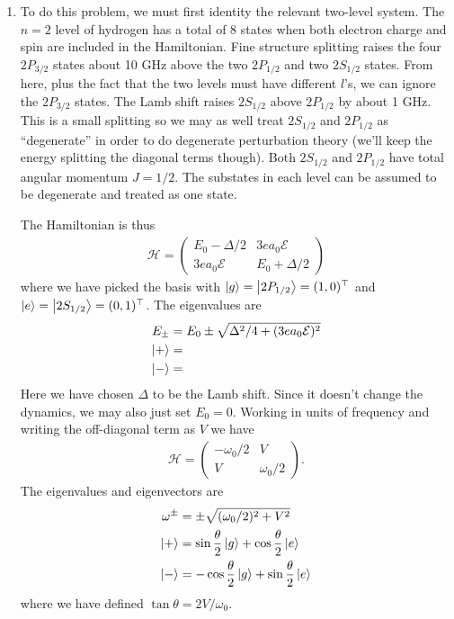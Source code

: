 \documentclass{article}
\theoremstyle{definition}
\newcommand{\ham}{\mathcal{H}}
\newcommand{\f}[2]{\frac{#1}{#2}}
\begin{document}
\begin{enumerate}[label=(\alph*)]
	\item To do this problem, we must first identity the relevant two-level system. The $n=2$ level of hydrogen has a total of 8 states when both electron charge and spin are included in the Hamiltonian. Fine structure splitting raises the four $2P_{3/2}$ states about 10 GHz above the two $2P_{1/2}$ and two $2S_{1/2}$ states. From here, plus the fact that the two levels must have different $l$'s, we can ignore the $2P_{3/2}$ states. The Lamb shift raises $2S_{1/2}$ above $2P_{1/2}$ by about 1 GHz. This is a small splitting so we may as well treat $2S_{1/2}$ and $2P_{1/2}$ as ``degenerate'' in order to do degenerate perturbation theory (we'll keep the energy splitting the diagonal terms though). Both $2S_{1/2}$ and $2P_{1/2}$ have total angular momentum $J=1/2$. The substates in each level can be assumed to be degenerate and treated as one state. 
	
	The Hamiltonian is thus 
	\begin{align*}
	\ham = \begin{pmatrix}
	E_0 - \Delta/2 & 3ea_0\mathcal{E} \\ 3ea_0\mathcal{E} & E_0 + \Delta/2
	\end{pmatrix}
	\end{align*}
	where we have picked the basis with $\ket{g} = \ket{2P_{1/2}} = (1,0)^\top$ and $\ket{e} = \ket{2S_{1/2}} = (0,1)^\top$. The eigenvalues are
	\begin{align*}
	E_\pm &= E_0 \pm \sqrt{\Delta^2/4 + (3ea_0\mathcal{E})^2}\\
	\ket{+} &= \\
	\ket{-} &= 
	\end{align*}
	Here we have chosen $\Delta$ to be the Lamb shift. 	Since it doesn't change the dynamics, we may also just set $E_0  = 0$. Working in units of frequency and writing the off-diagonal term as $V$ we have
	\begin{align*}
	\ham= \begin{pmatrix}
	-\omega_0/2 & V \\ V& \omega_0 /2
	\end{pmatrix}.
	\end{align*}
	The eigenvalues and eigenvectors are
	\begin{align*}
	\omega^\pm &= \pm \sqrt{(\omega_0/2)^2 + V^2}\\
	\ket{+} &= \sin \f{\theta}{2}\ket{g} + \cos\f{\theta}{2}\ket{e}\\
	\ket{-} &= -\cos\f{\theta}{2}\ket{g} + \sin\f{\theta}{2}\ket{e}
	\end{align*}
	where we have defined $\tan\theta = 2V/\omega_0$. 
	

\end{enumerate}
\end{document}
